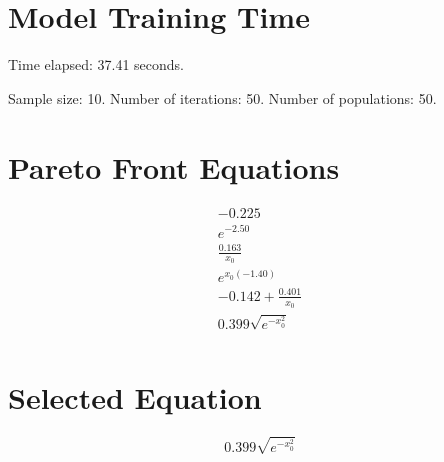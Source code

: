 \documentclass{article}
\begin{document}
\section*{Model Training Time}
Time elapsed: 37.41 seconds.

Sample size: 10.
Number of iterations: 50.
Number of populations: 50.

\section*{Pareto Front Equations}
\begin{align*}
-0.225 \\
e^{-2.50} \\
\frac{0.163}{x_{0}} \\
e^{x_{0} \left(-1.40\right)} \\
-0.142 + \frac{0.401}{x_{0}} \\
0.399 \sqrt{e^{- x_{0}^{2}}} \\
\end{align*}

\section*{Selected Equation}
\[ 0.399 \sqrt{e^{- x_{0}^{2}}} \]
\end{document}
